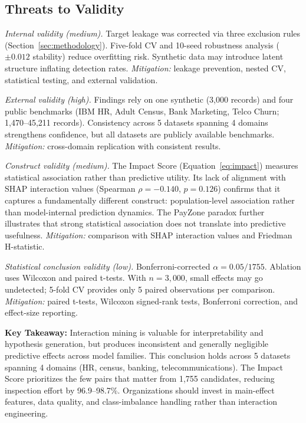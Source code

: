 \documentclass[conference]{IEEEtran}
\begin{document}
\subsection{Threats to Validity}

\textit{Internal validity (medium).} Target leakage was corrected via three exclusion rules (Section~\ref{sec:methodology}). Five-fold CV and 10-seed robustness analysis ($\pm0.012$ stability) reduce overfitting risk. Synthetic data may introduce latent structure inflating detection rates. \textit{Mitigation:} leakage prevention, nested CV, statistical testing, and external validation.

\textit{External validity (high).} Findings rely on one synthetic (3,000 records) and four public benchmarks (IBM HR, Adult Census, Bank Marketing, Telco Churn; 1,470--45,211 records). Consistency across 5 datasets spanning 4 domains strengthens confidence, but all datasets are publicly available benchmarks. \textit{Mitigation:} cross-domain replication with consistent results.

\textit{Construct validity (medium).} The Impact Score (Equation~\ref{eq:impact}) measures statistical association rather than predictive utility. Its lack of alignment with SHAP interaction values (Spearman $\rho=-0.140$, $p=0.126$) confirms that it captures a fundamentally different construct: population-level association rather than model-internal prediction dynamics. The PayZone paradox further illustrates that strong statistical association does not translate into predictive usefulness. \textit{Mitigation:} comparison with SHAP interaction values and Friedman H-statistic.

\textit{Statistical conclusion validity (low).} Bonferroni-corrected $\alpha = 0.05/1755$. Ablation uses Wilcoxon and paired t-tests. With $n=3{,}000$, small effects may go undetected; 5-fold CV provides only 5 paired observations per comparison. \textit{Mitigation:} paired t-tests, Wilcoxon signed-rank tests, Bonferroni correction, and effect-size reporting.

\noindent\textbf{Key Takeaway:} Interaction mining is valuable for interpretability and hypothesis generation, but produces inconsistent and generally negligible predictive effects across model families. This conclusion holds across 5 datasets spanning 4 domains (HR, census, banking, telecommunications). The Impact Score prioritizes the few pairs that matter from 1,755 candidates, reducing inspection effort by 96.9--98.7\%. Organizations should invest in main-effect features, data quality, and class-imbalance handling rather than interaction engineering.
\end{document}
